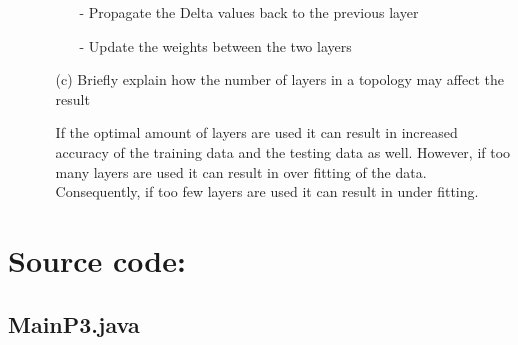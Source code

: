 \begin{enumerate}
\begin{enumerate}
				\begin{enumerate}
				
					\item[-] Propagate the Delta values back to the previous layer
					
					\item[-] Update the weights between the two layers
				
				\end{enumerate}
					
			\item[(c)] Briefly explain how the number of layers in a topology may affect the result
			
			If the optimal amount of layers are used it can result in increased accuracy of the training data and the testing data as well. However, if too many layers are used it can result in over fitting of the data. Consequently, if too few layers are used it can result in under fitting.
			
			
			
		\end{enumerate}
			
\end{enumerate}

\section{Source code:}

\subsection{MainP3.java}

